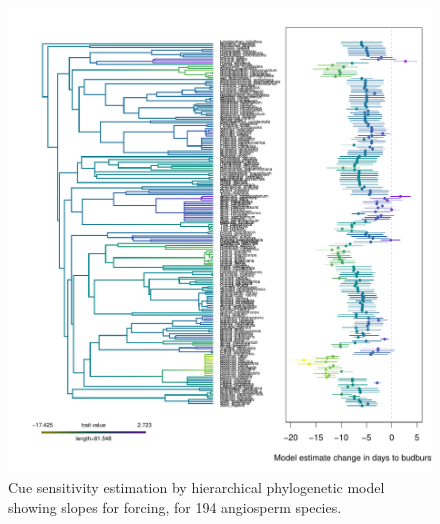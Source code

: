 \documentclass{article}\usepackage[]{graphicx}\usepackage[]{color}
\begin{document}
\begin{figure} [H]
  \begin{center}
  \includegraphics[width=14cm]{..//..//analyses/phylogeny/figures/muplot_phylo_force.pdf}
  \caption{Cue sensitivity estimation by hierarchical phylogenetic model showing slopes for forcing, for 194 angiosperm species.}
  \label{fig:muplot_force}
  \end{center}
\end{figure}
\end{document}
